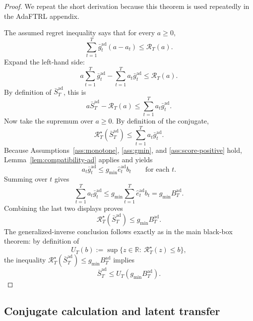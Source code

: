 \documentclass[11pt]{article}
\newcommand{\R}{\mathbb{R}}
\newcommand{\1}{\mathbf{1}}
\begin{document}
\begin{proof}
We repeat the short derivation because this theorem is used repeatedly in the AdaFTRL appendix.

The assumed regret inequality says that for every $a\ge 0$,
\[
\sum_{t=1}^T \bar g_t^{\mathrm{ad}}(a-a_t)\le \mathcal R_T(a).
\]
Expand the left-hand side:
\[
a\sum_{t=1}^T \bar g_t^{\mathrm{ad}}-\sum_{t=1}^T a_t\bar g_t^{\mathrm{ad}}\le \mathcal R_T(a).
\]
By definition of $\bar S_T^{\mathrm{ad}}$, this is
\[
a\bar S_T^{\mathrm{ad}}-\mathcal R_T(a)\le \sum_{t=1}^T a_t\bar g_t^{\mathrm{ad}}.
\]
Now take the supremum over $a\ge 0$. By definition of the conjugate,
\[
\mathcal R_T^\star(\bar S_T^{\mathrm{ad}})\le \sum_{t=1}^T a_t\bar g_t^{\mathrm{ad}}.
\]
Because Assumptions~\ref{ass:monotone}, \ref{ass:gmin}, and \ref{ass:score-positive} hold, Lemma~\ref{lem:compatibility-ad} applies and yields
\[
a_t\bar g_t^{\mathrm{ad}}\le g_{\min}\hat e_t^{\mathrm{ad}} b_t
\qquad\text{for each }t.
\]
Summing over $t$ gives
\[
\sum_{t=1}^T a_t\bar g_t^{\mathrm{ad}}\le g_{\min}\sum_{t=1}^T \hat e_t^{\mathrm{ad}} b_t=g_{\min}B_T^{\mathrm{ad}}.
\]
Combining the last two displays proves
\[
\mathcal R_T^\star(\bar S_T^{\mathrm{ad}})\le g_{\min}B_T^{\mathrm{ad}}.
\]
The generalized-inverse conclusion follows exactly as in the main black-box theorem: by definition of
\[
U_T(b):=\sup\{z\in\R:\ \mathcal R_T^\star(z)\le b\},
\]
the inequality $\mathcal R_T^\star(\bar S_T^{\mathrm{ad}})\le g_{\min}B_T^{\mathrm{ad}}$ implies
\[
\bar S_T^{\mathrm{ad}}\le U_T(g_{\min}B_T^{\mathrm{ad}}).
\]
\end{proof}

\subsection{Conjugate calculation and latent transfer}
\end{document}
